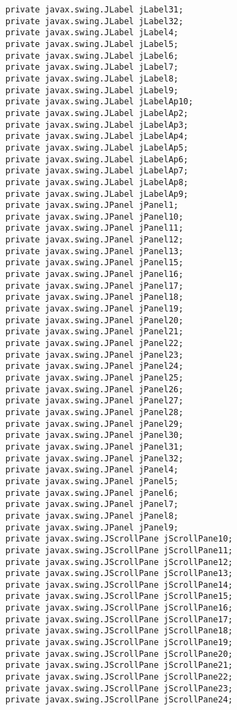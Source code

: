 \documentclass[12pt,a4paper]{article}
\begin{document}
\begin{lstlisting}
    private javax.swing.JLabel jLabel31;
    private javax.swing.JLabel jLabel32;
    private javax.swing.JLabel jLabel4;
    private javax.swing.JLabel jLabel5;
    private javax.swing.JLabel jLabel6;
    private javax.swing.JLabel jLabel7;
    private javax.swing.JLabel jLabel8;
    private javax.swing.JLabel jLabel9;
    private javax.swing.JLabel jLabelAp10;
    private javax.swing.JLabel jLabelAp2;
    private javax.swing.JLabel jLabelAp3;
    private javax.swing.JLabel jLabelAp4;
    private javax.swing.JLabel jLabelAp5;
    private javax.swing.JLabel jLabelAp6;
    private javax.swing.JLabel jLabelAp7;
    private javax.swing.JLabel jLabelAp8;
    private javax.swing.JLabel jLabelAp9;
    private javax.swing.JPanel jPanel1;
    private javax.swing.JPanel jPanel10;
    private javax.swing.JPanel jPanel11;
    private javax.swing.JPanel jPanel12;
    private javax.swing.JPanel jPanel13;
    private javax.swing.JPanel jPanel15;
    private javax.swing.JPanel jPanel16;
    private javax.swing.JPanel jPanel17;
    private javax.swing.JPanel jPanel18;
    private javax.swing.JPanel jPanel19;
    private javax.swing.JPanel jPanel20;
    private javax.swing.JPanel jPanel21;
    private javax.swing.JPanel jPanel22;
    private javax.swing.JPanel jPanel23;
    private javax.swing.JPanel jPanel24;
    private javax.swing.JPanel jPanel25;
    private javax.swing.JPanel jPanel26;
    private javax.swing.JPanel jPanel27;
    private javax.swing.JPanel jPanel28;
    private javax.swing.JPanel jPanel29;
    private javax.swing.JPanel jPanel30;
    private javax.swing.JPanel jPanel31;
    private javax.swing.JPanel jPanel32;
    private javax.swing.JPanel jPanel4;
    private javax.swing.JPanel jPanel5;
    private javax.swing.JPanel jPanel6;
    private javax.swing.JPanel jPanel7;
    private javax.swing.JPanel jPanel8;
    private javax.swing.JPanel jPanel9;
    private javax.swing.JScrollPane jScrollPane10;
    private javax.swing.JScrollPane jScrollPane11;
    private javax.swing.JScrollPane jScrollPane12;
    private javax.swing.JScrollPane jScrollPane13;
    private javax.swing.JScrollPane jScrollPane14;
    private javax.swing.JScrollPane jScrollPane15;
    private javax.swing.JScrollPane jScrollPane16;
    private javax.swing.JScrollPane jScrollPane17;
    private javax.swing.JScrollPane jScrollPane18;
    private javax.swing.JScrollPane jScrollPane19;
    private javax.swing.JScrollPane jScrollPane20;
    private javax.swing.JScrollPane jScrollPane21;
    private javax.swing.JScrollPane jScrollPane22;
    private javax.swing.JScrollPane jScrollPane23;
    private javax.swing.JScrollPane jScrollPane24;

\end{lstlisting}
\end{document}
